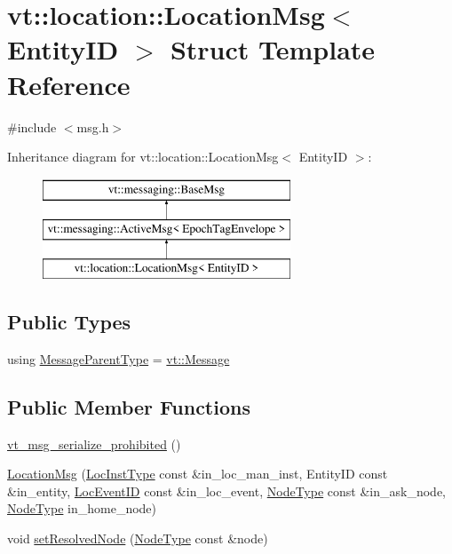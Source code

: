 \hypertarget{structvt_1_1location_1_1_location_msg}{}\section{vt\+:\+:location\+:\+:Location\+Msg$<$ Entity\+ID $>$ Struct Template Reference}
\label{structvt_1_1location_1_1_location_msg}


{\ttfamily \#include $<$msg.\+h$>$}

Inheritance diagram for vt\+:\+:location\+:\+:Location\+Msg$<$ Entity\+ID $>$\+:\begin{figure}[H]
\begin{center}
\leavevmode
\includegraphics[height=3.000000cm]{structvt_1_1location_1_1_location_msg}
\end{center}
\end{figure}
\subsection*{Public Types}
\begin{DoxyCompactItemize}
\item 
using \hyperlink{structvt_1_1location_1_1_location_msg_a025bf9f7e29a87fbe01735e2a5db0857}{Message\+Parent\+Type} = \hyperlink{namespacevt_a3a3ddfef40b4c90915fa43cdd5f129ea}{vt\+::\+Message}
\end{DoxyCompactItemize}
\subsection*{Public Member Functions}
\begin{DoxyCompactItemize}
\item 
\hyperlink{structvt_1_1location_1_1_location_msg_a772844def532d4cbe03f197d621d501e}{vt\+\_\+msg\+\_\+serialize\+\_\+prohibited} ()
\item 
\hyperlink{structvt_1_1location_1_1_location_msg_af1b76aa81c81ed8ed2a9c9db4e5cff45}{Location\+Msg} (\hyperlink{namespacevt_1_1location_a4db6456e8024af2d23fc5ae560fef866}{Loc\+Inst\+Type} const \&in\+\_\+loc\+\_\+man\+\_\+inst, Entity\+ID const \&in\+\_\+entity, \hyperlink{namespacevt_1_1location_aa5ccc1a42aa22b0b41fcfbbdee314dca}{Loc\+Event\+ID} const \&in\+\_\+loc\+\_\+event, \hyperlink{namespacevt_a866da9d0efc19c0a1ce79e9e492f47e2}{Node\+Type} const \&in\+\_\+ask\+\_\+node, \hyperlink{namespacevt_a866da9d0efc19c0a1ce79e9e492f47e2}{Node\+Type} in\+\_\+home\+\_\+node)
\item 
void \hyperlink{structvt_1_1location_1_1_location_msg_a98f01158208640bb88e0d4583694f9bb}{set\+Resolved\+Node} (\hyperlink{namespacevt_a866da9d0efc19c0a1ce79e9e492f47e2}{Node\+Type} const \&node)
\end{DoxyCompactItemize}
